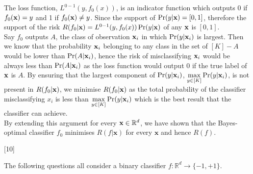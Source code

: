 \documentclass[]{../util/ColumbiaAssm}
\begin{document}
\begin{questions}
\begin{solution}
The loss function, $L^{0-1}(y, f_0(x))$, is an indicator function which outputs 0 if $f_0(\mathbf{x}) = y$ and 1 if $f_0(\mathbf{x}) \neq y$. Since the support of $\Pr(y|\mathbf{x}) = [0,1]$,  therefore the support of the risk $R(f_0|\mathbf{x}) = L^{0-1}(y, f_0(x))\Pr(y|\mathbf{x})$ of any $\mathbf{x}$ is $[0,1]$.\\

Say $f_0$ outputs $A$, the class of observation $\mathbf{x}_i$ in which $\Pr(y|\mathbf{x}_i)$ is largest. Then we know that the probability $\mathbf{x}_i$ belonging to any class in the set of $[K] - A$ would be lower than $\Pr(A|\mathbf{x}_i)$, hence the risk of misclassifying $\mathbf{x}_i$ would be always less than $\Pr(A|\mathbf{x}_i)$ as the loss function would output 0 if the true label of $\mathbf{x}$ is $A$. By ensuring that the largest component of $\Pr(y|\mathbf{x}_i)$, $\underset{y \in [K]}\max \Pr(y|\mathbf{x}_i)$, is not present in $R(f_0|\mathbf{x})$, we minimise $R(f_0|\mathbf{x})$ as the total probability of the classifier misclassifying $x_i$ is less than $\underset{y \in [K]}\max \Pr(y|\mathbf{x}_i)$ which is the best result that the classifier can achieve.\\

By extending this argument for every $\mathbf{x} \in \mathbb{R}^d$, we have shown that the Bayes-optimal classifier $f_0$ minimises $R(f|\mathbf{x})$ for every $\mathbf{x}$ and hence $R(f)$.  

\end{solution}

[10] 

The following questions all consider a binary classifier $f : \mathbb{R}^d \rightarrow \{-1,+1\}$.

\end{questions}
\end{document}
